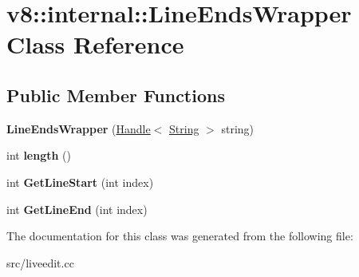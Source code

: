 \hypertarget{classv8_1_1internal_1_1_line_ends_wrapper}{}\section{v8\+:\+:internal\+:\+:Line\+Ends\+Wrapper Class Reference}
\label{classv8_1_1internal_1_1_line_ends_wrapper}
\subsection*{Public Member Functions}
\begin{DoxyCompactItemize}
\item 
\hypertarget{classv8_1_1internal_1_1_line_ends_wrapper_af87075f1b0bb1fea96f1a0c2b281fb3b}{}{\bfseries Line\+Ends\+Wrapper} (\hyperlink{classv8_1_1internal_1_1_handle}{Handle}$<$ \hyperlink{classv8_1_1internal_1_1_string}{String} $>$ string)\label{classv8_1_1internal_1_1_line_ends_wrapper_af87075f1b0bb1fea96f1a0c2b281fb3b}

\item 
\hypertarget{classv8_1_1internal_1_1_line_ends_wrapper_a4f4f4f81a273062344279f197fe103a6}{}int {\bfseries length} ()\label{classv8_1_1internal_1_1_line_ends_wrapper_a4f4f4f81a273062344279f197fe103a6}

\item 
\hypertarget{classv8_1_1internal_1_1_line_ends_wrapper_a61703dd03610aaa95d683c63eb8f214a}{}int {\bfseries Get\+Line\+Start} (int index)\label{classv8_1_1internal_1_1_line_ends_wrapper_a61703dd03610aaa95d683c63eb8f214a}

\item 
\hypertarget{classv8_1_1internal_1_1_line_ends_wrapper_a83e4cb4c6a06eea674dc9bf3743131ad}{}int {\bfseries Get\+Line\+End} (int index)\label{classv8_1_1internal_1_1_line_ends_wrapper_a83e4cb4c6a06eea674dc9bf3743131ad}

\end{DoxyCompactItemize}


The documentation for this class was generated from the following file\+:\begin{DoxyCompactItemize}
\item 
src/liveedit.\+cc\end{DoxyCompactItemize}
